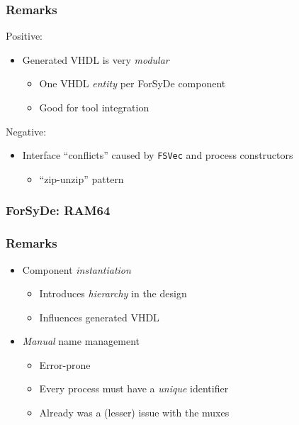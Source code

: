         \begin{frame}
            \frametitle{Remarks}
            \par{Positive:}
            \begin{itemize}
                \item Generated VHDL is very \emph{modular}
                    \begin{itemize}
                        \item One VHDL \emph{entity} per ForSyDe component
                        \item Good for tool integration
                    \end{itemize}
            \end{itemize}

            \par{Negative:}
            \begin{itemize}
                \item Interface ``conflicts'' caused by \texttt{FSVec} and process constructors
                    \begin{itemize}
                        \item ``zip-unzip'' pattern
                    \end{itemize}
            \end{itemize}
        \end{frame}

        \begin{frame}
            \frametitle{ForSyDe: RAM64}
        \end{frame}

        \begin{frame}
            \frametitle{Remarks}

            \begin{itemize}
                \item Component \emph{instantiation}
                    \begin{itemize}
                        \item Introduces \emph{hierarchy} in the design
                        \item Influences generated VHDL
                    \end{itemize}
                \item \emph{Manual} name management
                    \begin{itemize}
                        \item Error-prone
                        \item Every process must have a \emph{unique} identifier
                        \item Already was a (lesser) issue with the muxes
                    \end{itemize}
            \end{itemize}
        \end{frame}

